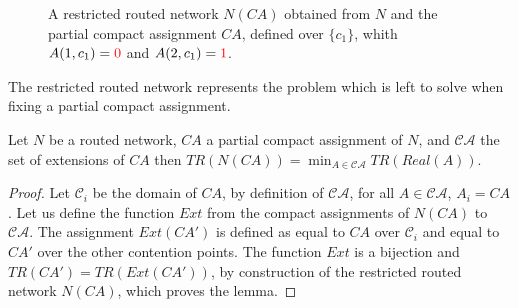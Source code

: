\begin{figure}
\begin{center}
{
}

 \caption{A restricted routed network $N(CA)$ obtained from $N$ and the partial compact assignment $CA$, defined over $\{c_1\}$, whith $A(1,c_1) = \textcolor{red}{0}$ and $A(2,c_1) = \textcolor{red}{1}$.}

\label{fig:randomnetworks}
\end{center}
\end{figure}

The restricted routed network represents the problem which is left to solve 
when fixing a partial compact assignment.

\begin{lemma}\label{lemma:restriction}
Let $N$ be a routed network, $CA$ a partial compact assignment of $N$, and $\mathcal{CA}$
the set of extensions of $CA$ then $TR(N(CA)) = \min_{ A \in \mathcal{CA}} TR(Real(A))$.
\end{lemma}
\begin{proof}
Let $\mathcal{C}_i$ be the domain of $CA$, by definition of $\mathcal{CA}$, 
for all $A \in \mathcal{CA}$, $A_i = CA$. Let us define the function $Ext$ from the
compact assignments of $N(CA)$ to $\mathcal{CA}$. The assignment $Ext(CA')$ is 
defined as equal to $CA$ over $\mathcal{C}_i$ and equal to $CA'$ over the other contention points.
The function $Ext$ is a bijection and $TR(CA') = TR(Ext(CA'))$, by construction of the restricted routed network
$N(CA)$, which proves the lemma.
\end{proof}

